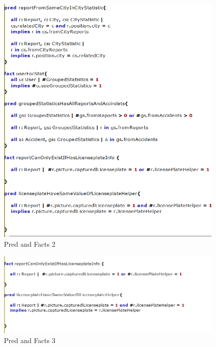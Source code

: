 \begin{figure}
	\centering
	\includegraphics[width=0.9\linewidth, height=0.8\textheight]{Images/Alloy/codealloy5}
	\caption{Pred and Facts 2}
	\label{Pred and Facts 2}
\end{figure}

\begin{figure}
	\centering
	\includegraphics[width=0.9\linewidth, height=0.3\textheight]{Images/Alloy/codealloy6}
	\caption{Pred and Facts 3}
	\label{Pred and Facts 3}
\end{figure}

